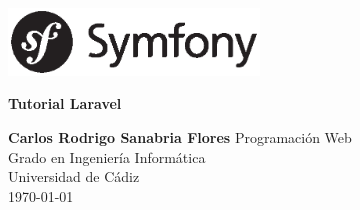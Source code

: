 \begin{titlepage}
    \includegraphics[width=0.5\textwidth]{assets/symfony_logo.eps}
   \begin{center}
       \vspace*{6cm}
 
       \textbf{\LARGE{Tutorial Laravel}}
 
       \vspace{0.5cm}
       \textbf{\LARGE{Carlos Rodrigo Sanabria Flores}}
       \vspace{2cm}
       \vfill
       Programación Web\\
       Grado en Ingeniería Informática\\
       Universidad de Cádiz\\
       \today
       \vspace{2cm}
 
   \end{center}
\end{titlepage}